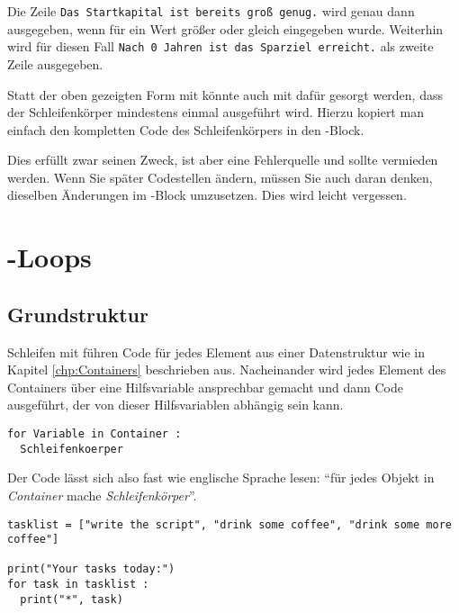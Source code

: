 Die Zeile \texttt{Das Startkapital ist bereits groß genug.} wird genau dann ausgegeben, wenn für  ein Wert größer oder gleich  eingegeben wurde. Weiterhin wird für diesen Fall \texttt{Nach 0 Jahren ist das Sparziel erreicht.} als zweite Zeile ausgegeben.

\begin{warnbox}
Statt der oben gezeigten Form mit  könnte auch mit  dafür gesorgt werden, dass der Schleifenkörper mindestens einmal ausgeführt wird. Hierzu kopiert man einfach den kompletten Code des Schleifenkörpers in den -Block.

Dies erfüllt zwar seinen Zweck, ist aber eine Fehlerquelle und sollte vermieden werden. Wenn Sie später Codestellen ändern, müssen Sie auch daran denken, dieselben Änderungen im -Block umzusetzen. Dies wird leicht vergessen.
\end{warnbox}

    
\section{-Loops}
\subsection{Grundstruktur}
Schleifen mit  führen Code für jedes Element aus einer Datenstruktur wie in Kapitel \ref{chp:Containers} beschrieben aus. Nacheinander wird jedes Element des Containers über eine Hilfsvariable ansprechbar gemacht und dann Code ausgeführt, der von dieser Hilfsvariablen abhängig sein kann.

\begin{codebox}
\begin{verbatim}
for Variable in Container :
  Schleifenkoerper
\end{verbatim}
\end{codebox}

Der Code lässt sich also fast wie englische Sprache lesen: \enquote{für jedes Objekt in \emph{Container} mache \emph{Schleifenkörper}}.

\begin{codebox}
\begin{verbatim}
tasklist = ["write the script", "drink some coffee", "drink some more coffee"]

print("Your tasks today:")
for task in tasklist :
  print("*", task)
\end{verbatim}
\end{codebox}


